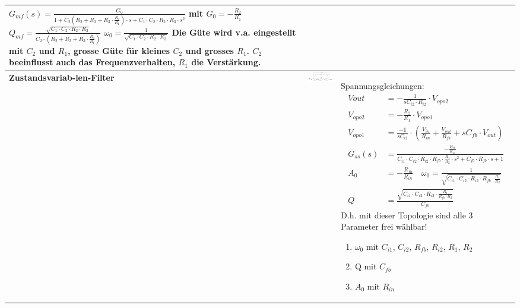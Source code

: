 \begin{longtable}{|>{\bfseries}p{3cm}|c|p{10cm}|}
{         $G_{mf}(s)	=\frac{G_0}{1+C_2(R_2+R_3+R_3\cdot \frac{R_2}{R_1})\cdot s+C_1\cdot C_2\cdot R_2\cdot R_3\cdot s^2}$ mit $ G_0 = -\frac{R_2}{R_1}$\newline
         $Q_{mf} =\frac{\sqrt{C_1\cdot C_2\cdot R_2\cdot R_3}}{C_2\cdot (R_2+R_3+R_3\cdot \frac{R_2}{R_1})}$ \qquad $\omega_0 = \frac{1}{\sqrt{C_1 \cdot C_2 \cdot R_2 \cdot R_3}}$\newline
         Die Güte wird v.a. eingestellt mit $C_2$ und $R_1$, grosse Güte für kleines $C_2$ und grosses $R_1$. $C_2$ beeinflusst auch das Frequenzverhalten, $R_1$ die Verstärkung.
        }
      \\ \hline
      {Zustandsvariab-len-Filter
      }
      & \includegraphics[width=8cm, valign=b,angle=270]{./images/zustandsvariable.png}
      & {Spannungsgleichungen:\newline
         \begin{align*}
             V{out}		&=-\frac{1}{s C_{i2}\cdot R_{i2}}\cdot V_{opo2}\\
             V_{opo2}	&=-\frac{R_2}{R_1}\cdot V_{opo1}\\
             V_{opo1}	&=\frac{-1}{s C_{i1}}\cdot \left(\frac{V_{in}}{R_{in}}+
             \frac{V_{out}}{R_{fb}}+s C_{fb}\cdot V_{out}\right)\\
             G_{ss}(s)	&=\frac{-\frac{R_{fb}}{R_{in}}}{C_{i1}\cdot C_{i2}\cdot R_{i2}\cdot
             R_{fb}\cdot \frac{R_1}{R_2}\cdot s^2+C_{fb}\cdot R_{fb}\cdot s+1}\\
             A_{0}		&=-\frac{R_{fb}}{R_{in}}\quad
             \omega_{0}	=\frac{1}{\sqrt{C_{i1}\cdot C_{i2}\cdot R_{i2}\cdot R_{fb}\cdot \frac{R_1}{R_2}}}\\
             Q			&=\frac{\sqrt{C_{i1}\cdot C_{i2}\cdot R_{i2}\cdot \frac{R_1}{R_{fb}\cdot R_2}}}{C_{fb}}
         \end{align*}
         D.h. mit dieser Topologie sind alle 3 Parameter frei wählbar!
         \begin{enumerate}
             \item $\omega_{0}$ mit $C_{i1}$, $C_{i2}$, $R_{fb}$, $R_{i2}$, $R_1$, $R_2$
             \item Q mit $C_{fb}$
             \item $A_0$ mit $R_{in}$
         \end{enumerate}
        }
      \\ \hline
\end{longtable}


